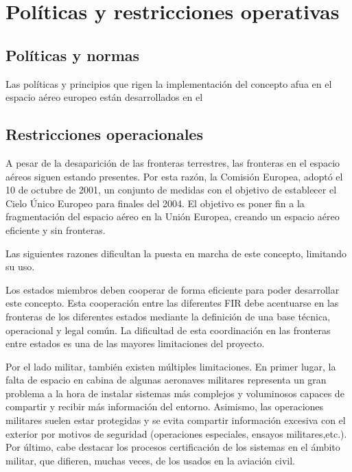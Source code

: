 \section{Políticas y restricciones operativas}

\subsection{Políticas y normas}

Las políticas y principios que rigen la implementación del concepto \acrfull{afua} en el espacio aéreo europeo están desarrollados en el \cite{}

\subsection{Restricciones operacionales}

A pesar de la desaparición de las fronteras terrestres, las fronteras en el espacio aéreos siguen estando presentes. Por esta razón, la Comisión Europea, adoptó el 10 de octubre de 2001, un conjunto de medidas con el objetivo de establecer el Cielo Único Europeo para finales del 2004. El objetivo es poner fin a la fragmentación del espacio aéreo en la Unión Europea, creando un espacio aéreo eficiente y sin fronteras.  

Las siguientes razones dificultan la puesta en marcha de este concepto, limitando su uso.  

Los estados miembros deben cooperar de forma eficiente para poder desarrollar este concepto. Esta cooperación entre las diferentes FIR debe acentuarse en las fronteras de los diferentes estados mediante la definición de una base técnica, operacional y legal común. La dificultad de esta coordinación en las fronteras entre estados es una de las mayores limitaciones del proyecto.

Por el lado militar, también existen múltiples limitaciones. En primer lugar, la falta de espacio en cabina de algunas aeronaves militares representa un gran problema a la hora de instalar sistemas más complejos y voluminosos capaces de compartir y recibir más información del entorno. Asimismo, las operaciones militares suelen estar protegidas y se evita compartir información excesiva con el exterior por motivos de seguridad (operaciones especiales, ensayos militares,etc.). Por último, cabe destacar los procesos certificación de los sistemas en el ámbito militar, que difieren, muchas veces, de los usados en la aviación civil.